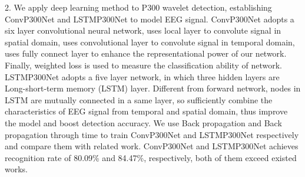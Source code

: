 \begin{englishabstract}
2. We apply deep learning method to P300 wavelet detection, establishing ConvP300Net and LSTMP300Net to model EEG signal. ConvP300Net adopts a six layer convolutional neural network, uses local layer to convolute signal in spatial domain, uses convolutional layer to convolute signal in temporal domain, uses fully connect layer to enhance the representational power of our network. Finally, weighted loss is used to measure the classification ability of network. LSTMP300Net adopts a five layer network, in which three hidden layers are Long-short-term memory (LSTM) layer.  Different from forward network, nodes in LSTM are mutually connected in a same layer, so sufficiently combine the characteristics of EEG signal from temporal and spatial domain, thus improve the model and boost detection accuracy. We use Back propagation and Back propagation through time to train ConvP300Net and LSTMP300Net respectively and compare them with related work. ConvP300Net and LSTMP300Net achieves recognition rate of 80.09\% and 84.47\%, respectively, both of them exceed existed works. 




\end{englishabstract}
